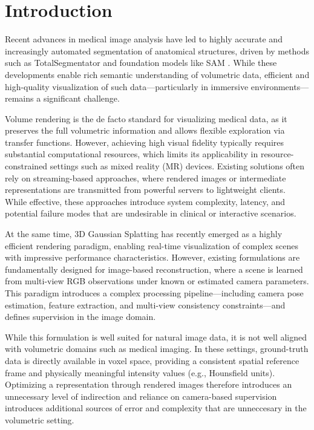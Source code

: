 \documentclass[runningheads]{llncs}
\begin{document}
\section{Introduction}

Recent advances in medical image analysis have led to highly accurate and increasingly automated segmentation of anatomical structures, driven by methods such as TotalSegmentator \cite{totalsegmentator} and foundation models like SAM \cite{sam}. While these developments enable rich semantic understanding of volumetric data, efficient and high-quality visualization of such data—particularly in immersive environments—remains a significant challenge.

Volume rendering is the de facto standard for visualizing medical data, as it preserves the full volumetric information and allows flexible exploration via transfer functions. However, achieving high visual fidelity typically requires substantial computational resources, which limits its applicability in resource-constrained settings such as mixed reality (MR) devices. Existing solutions often rely on streaming-based approaches, where rendered images or intermediate representations are transmitted from powerful servers to lightweight clients. While effective, these approaches introduce system complexity, latency, and potential failure modes that are undesirable in clinical or interactive scenarios.

At the same time, 3D Gaussian Splatting \cite{kerbl2023gaussiansplatting} has recently emerged as a highly efficient rendering paradigm, enabling real-time visualization of complex scenes with impressive performance characteristics. However, existing formulations are fundamentally designed for image-based reconstruction, where a scene is learned from multi-view RGB observations under known or estimated camera parameters. This paradigm introduces a complex processing pipeline—including camera pose estimation, feature extraction, and multi-view consistency constraints—and defines supervision in the image domain.

While this formulation is well suited for natural image data, it is not well aligned with volumetric domains such as medical imaging. In these settings, ground-truth data is directly available in voxel space, providing a consistent spatial reference frame and physically meaningful intensity values (e.g., Hounsfield units). Optimizing a representation through rendered images therefore introduces an unnecessary level of indirection and reliance on camera-based supervision introduces additional sources of error and complexity that are unneccesary in the volumetric setting.
\end{document}
